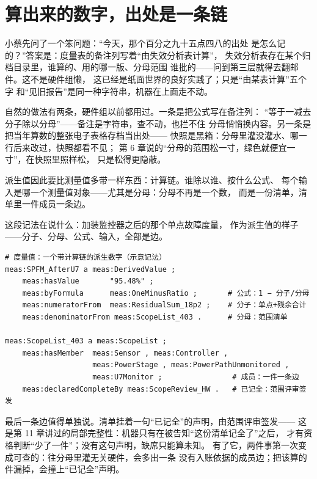 \section{算出来的数字，出处是一条链}

小蔡先问了一个笨问题：“今天，那个百分之九十五点四八的出处
是怎么记的？”答案是：度量表的备注列写着“由失效分析表计算”，
失效分析表存在某个归档目录里，谁算的、用的哪一版、分母范围
谁批的——问到第三层就得去翻邮件。这不是硬件组懒，
这已经是纸面世界的良好实践了；只是“由某表计算”五个字
和“见旧报告”是同一种字符串，机器在上面走不动。

自然的做法有两条，硬件组以前都用过。一条是把公式写在备注列：
“等于一减去分子除以分母”——备注是字符串，查不动，也拦不住
分母悄悄换内容。另一条是把当年算数的整张电子表格存档当出处——
快照是黑箱：分母里灌没灌水、哪一行后来改过，快照都看不见；
第 6 章说的“分母的范围松一寸，绿色就便宜一寸”，在快照里照样松，
只是松得更隐蔽。

派生值因此要比测量值多带一样东西：计算链。谁除以谁、按什么公式、
每个输入是哪一个测量值对象——尤其是分母：分母不再是一个数，
而是一份清单，清单里一件成员一条边。

这段记法在说什么：加装监控器之后的那个单点故障度量，
作为派生值的样子——分子、分母、公式、输入，全部是边。

\nopagebreak[4]
\begin{codebox}
\begin{Verbatim}[fontsize=\small,breaklines=true,breakanywhere=true,breaksymbolleft={},breaksymbolright={}]
# 度量值：一个带计算链的派生数字（示意记法）
meas:SPFM_AfterU7 a meas:DerivedValue ;
    meas:hasValue       "95.48%" ;
    meas:byFormula      meas:OneMinusRatio ;       # 公式：1 − 分子/分母
    meas:numeratorFrom  meas:ResidualSum_18p2 ;    # 分子：单点+残余合计
    meas:denominatorFrom meas:ScopeList_403 .      # 分母：范围清单

meas:ScopeList_403 a meas:ScopeList ;
    meas:hasMember  meas:Sensor , meas:Controller ,
                    meas:PowerStage , meas:PowerPathUnmonitored ,
                    meas:U7Monitor ;                # 成员：一件一条边
    meas:declaredCompleteBy meas:ScopeReview_HW .   # 已记全：范围评审签发
\end{Verbatim}
\end{codebox}

最后一条边值得单独说。清单挂着一句“已记全”的声明，由范围评审签发——
这是第 11 章讲过的局部完整性：机器只有在被告知“这份清单记全了”之后，
才有资格判断“少了一件”；没有这句声明，缺席只能算未知。
有了它，两件事第一次变成可查的：往分母里灌无关硬件，会多出一条
没有入账依据的成员边；把该算的件漏掉，会撞上“已记全”声明。

